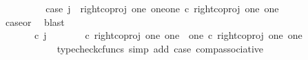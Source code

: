 \begin{isabellebody}
\ \ \ \ \ \ \isamarkupfalse%
\ \isamarkupfalse%
\ case{}{\isacharcolon}{\kern0pt}\ {\isachardoublequoteopen}j\ {\isacharequal}{\kern0pt}\ right{\isacharunderscore}{\kern0pt}coproj\ one\ {\isacharparenleft}{\kern0pt}one{\isasymCoprod}one{\isacharparenright}{\kern0pt}\ {\isasymcirc}\isactrlsub c\ right{\isacharunderscore}{\kern0pt}coproj\ one\ one{\isachardoublequoteclose}\isanewline
\ \ \ \ \ \ \ \ \isamarkupfalse%
\ case{}{\isacharunderscore}{\kern0pt}or{\isacharunderscore}{\kern0pt}{}\ \isamarkupfalse%
\ blast\isanewline
\ \ \ \ \ \ \isamarkupfalse%
\ {\isachardoublequoteopen}{\isasymlangle}{\isasymf}{\isacharcomma}{\kern0pt}\ {\isasymt}{\isasymrangle}\ {\isacharequal}{\kern0pt}\ {\isasymlangle}{\isasymf}{\isacharcomma}{\kern0pt}{\isasymf}{\isasymrangle}{\isachardoublequoteclose}\isanewline
\ \ \ \ \ \ \isamarkupfalse%
\ {\isacharminus}{\kern0pt}\ \isanewline
\ \ \ \ \ \ \ \ \isamarkupfalse%
\ {\isachardoublequoteopen}{\isacharparenleft}{\kern0pt}{\isasymlangle}{\isasymt}{\isacharcomma}{\kern0pt}\ {\isasymt}{\isasymrangle}{\isasymamalg}\ {\isacharparenleft}{\kern0pt}{\isasymlangle}{\isasymt}{\isacharcomma}{\kern0pt}\ {\isasymf}{\isasymrangle}\ {\isasymamalg}{\isasymlangle}{\isasymf}{\isacharcomma}{\kern0pt}\ {\isasymt}{\isasymrangle}{\isacharparenright}{\kern0pt}{\isacharparenright}{\kern0pt}\ {\isasymcirc}\isactrlsub c\ j\ {\isacharequal}{\kern0pt}\ {\isacharparenleft}{\kern0pt}{\isacharparenleft}{\kern0pt}{\isasymlangle}{\isasymt}{\isacharcomma}{\kern0pt}\ {\isasymt}{\isasymrangle}{\isasymamalg}\ {\isacharparenleft}{\kern0pt}{\isasymlangle}{\isasymt}{\isacharcomma}{\kern0pt}\ {\isasymf}{\isasymrangle}\ {\isasymamalg}{\isasymlangle}{\isasymf}{\isacharcomma}{\kern0pt}\ {\isasymt}{\isasymrangle}{\isacharparenright}{\kern0pt}{\isacharparenright}{\kern0pt}\ {\isasymcirc}\isactrlsub c\ right{\isacharunderscore}{\kern0pt}coproj\ one\ {\isacharparenleft}{\kern0pt}one\ {\isasymCoprod}\ one{\isacharparenright}{\kern0pt}{\isacharparenright}{\kern0pt}\ {\isasymcirc}\isactrlsub c\ right{\isacharunderscore}{\kern0pt}coproj\ one\ one{\isachardoublequoteclose}\isanewline
\ \ \ \ \ \ \ \ \ \ \isamarkupfalse%
\ {\isacharparenleft}{\kern0pt}typecheck{\isacharunderscore}{\kern0pt}cfuncs{\isacharcomma}{\kern0pt}\ simp\ add{\isacharcolon}{\kern0pt}\ case{}\ comp{\isacharunderscore}{\kern0pt}associative{}{\isacharparenright}{\kern0pt}\isanewline
\ \ \ \ \ \ \ \ \isamarkupfalse%

\end{isabellebody}
